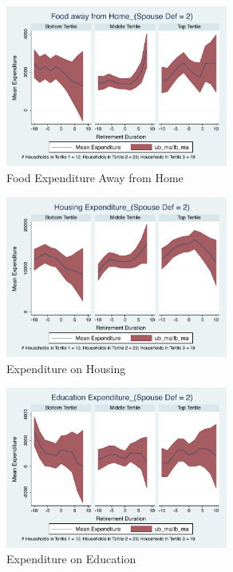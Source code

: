 \documentclass[11pt,onecolumn]{article}
\numberwithin{figure}{section}
\begin{document}
\begin{figure}[h]
	\caption{Food Expenditure Away from Home}
	\centering
	\includegraphics[width=0.65\textwidth]{../ConsumptionPostRetirement_by_SpouseDef_Cats/Smoothed/2/spouse_def_total_foodexp_away_real.pdf}
\end{figure}

\clearpage

\begin{figure}[h]
	\caption{Expenditure on Housing}
	\centering
	\includegraphics[width=0.65\textwidth]{../ConsumptionPostRetirement_by_SpouseDef_Cats/Smoothed/2/spouse_def_total_housing_real.pdf}
\end{figure}


\begin{figure}[h]
	\caption{Expenditure on Education}
	\centering
	\includegraphics[width=0.65\textwidth]{../ConsumptionPostRetirement_by_SpouseDef_Cats/Smoothed/2/spouse_def_total_education_real.pdf}
\end{figure}
\clearpage
\end{document}
